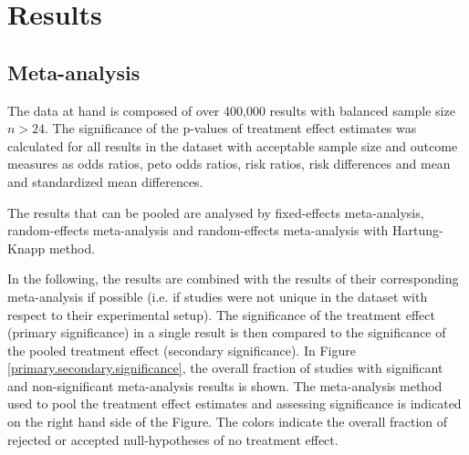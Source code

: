 \documentclass[11pt,a4paper,twoside]{book}\usepackage[]{graphicx}\usepackage[]{color}
\begin{document}












\chapter{Results}




\section{Meta-analysis}
The data at hand is composed of over 400,000 results with balanced sample size $n > 24$. The significance of the p-values of treatment effect estimates was calculated for all results in the dataset with acceptable sample size and outcome measures as odds ratios, peto odds ratios, risk ratios, risk differences and mean and standardized mean differences. 


The results that can be pooled are analysed by fixed-effects meta-analysis, random-effects meta-analysis and random-effects meta-analysis with Hartung-Knapp method.

\vspace{0mm}
In the following, the results are combined with the results of their corresponding meta-analysis if possible (i.e. if studies were not unique in the dataset with respect to their experimental setup). The significance of the treatment effect (primary significance) in a single result is then compared to the significance of the pooled treatment effect (secondary significance). 
In Figure \ref{primary.secondary.significance}, the overall fraction of studies with significant and non-significant meta-analysis results is shown. The meta-analysis method used to pool the treatment effect estimates and assessing significance is indicated on the right hand side of the Figure. The colors indicate the overall fraction of rejected or accepted null-hypotheses of no treatment effect.
\end{document}

